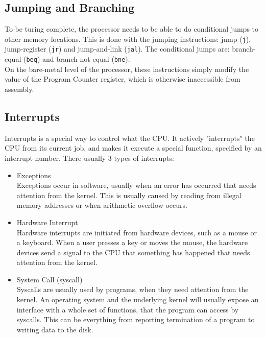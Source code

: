 \subsection{Jumping and Branching}
To be turing complete, the processor needs to be able to do conditional jumps
to other memory locations. This is done with the jumping instructions: jump
(\texttt{j}), jump-register (\texttt{jr}) and jump-and-link (\texttt{jal}). The
conditional jumps are: branch-equal (\texttt{beq}) and branch-not-equal
(\texttt{bne}).\\
On the bare-metal level of the processor, these instructions simply modify the
value of the Program Counter register, which is otherwise inaccessible from
assembly.

\subsection{Interrupts}
Interrupts is a special way to control what the CPU. It actively "interrupts"
the CPU from its current job, and makes it execute a special function,
specified by an interrupt number. There usually 3 types of interrupts\cite{osdev:interrupts}:
\begin{itemize}
	\item Exceptions\\
	Exceptions occur in software, usually when an error has occurred that
	needs attention from the kernel. This is usually caused by reading from
	illegal memory addresses or when arithmetic overflow occurs.

	\item Hardware Interrupt\\
Hardware interrupts are initiated from hardware devices, such as a
mouse or a keyboard. When a user presses a key or moves the mouse, the hardware
devices send a signal to the CPU that something has happened that needs
attention from the kernel.

	\item System Call (syscall)\\
	Syscalls are usually used by programs, when they need attention from
the kernel. An operating system and the underlying kernel will usually expose
an interface with a whole set of functions, that the program can access by
syscalls. This can be everything from reporting termination of a program to
writing data to the disk.
\end{itemize}

